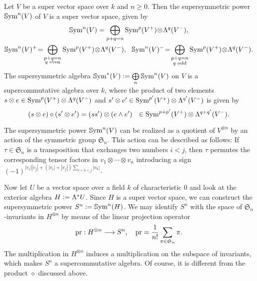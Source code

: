 \begin{definition}
Let $V$ be a super vector space over $k$ and $n\geq 0$. Then the supersymmetric power $\operatorname{\mathbb Sym}^n(V)$ of $V$ is a super vector space, given by
\begin{gather*}
\SSym^n(V) = \bigoplus_{p+q=n} \Sym^p(V^{+}) \!\otimes\! \Lambda^q(V^{-}), \\
\SSym^n(V)^{+}\! =\! \bigoplus_{\substack{p+q=n \\ q\text{ even} }} \Sym^p(V^{+}) \!\otimes\! \Lambda^q(V^{-}), \ \ 
\SSym^n(V)^{-}\! =\! \bigoplus_{\substack{p+q=n \\ q\text{ odd} }} \Sym^p(V^{+}) \!\otimes\! \Lambda^q(V^{-}).
\end{gather*}
The supersymmetric algebra $\operatorname{\mathbb Sym}^*(V)\vcentcolon=  \bigoplus\limits_n \operatorname{\mathbb Sym}^n(V)$ on $V$ is a supercommutative algebra over $k$, where the product of two elements $s\otimes e \in \operatorname{Sym}^p(V^{+}) \otimes \Lambda^q(V^{-})$ and $s'\otimes e' \in \operatorname{Sym}^{p'}(V^{+}) \otimes \Lambda^{q'}(V^{-})$ is given by 
$$
(s\otimes e)\diamond (s'\otimes e') = (s s')\otimes (e\wedge e') \ \  \in \operatorname{Sym}^{p+p'}(V^{+}) \otimes \Lambda^{q+q'}(V^{-}).
$$
\end{definition}
\begin{remark}
The supersymmetric power $\operatorname{\mathbb Sym}^n (V)$ can be realized as a quotient of $V^{\otimes n}$ by an action of the symmetric group $\mathfrak S_n$. This action can be described as follows: If $\tau\in \mathfrak S_n$ is a transposition that exchanges two numbers $i<j$, then $\tau$ permutes the corresponding tensor factors in $v_1\otimes  \cdots\otimes v_n$ introducing a sign
$(-1)^{|v_i||v_j|+(|v_i|+|v_j|)\sum_{i<k<j} |v_k|}$.
\end{remark}


Now let $U$ be a vector space over a field $k$ of characteristic $0$ and look at the exterior algebra $H\vcentcolon=  \Lambda^* U$. 
Since $H$ is a super vector space, we can construct the supersymmetric power $S^n\vcentcolon=  \operatorname{\mathbb Sym}^n( H)$.
We may identify $S^n$ with the space of $\mathfrak S_n$-invariants in $H^{\otimes n}$ by means of the linear projection operator
$$
\operatorname{pr} : H^{\otimes n} \longrightarrow S^n , \quad \operatorname{pr} = \frac{1}{n!}\sum_{\pi \in\mathfrak S_n} \pi.
$$
The multiplication in $H^{\otimes n}$ induces a multiplication on the subspace of invariants, which makes $S^n$ a supercommutative algebra. Of course, it is different from the product $\diamond$ discussed above.

